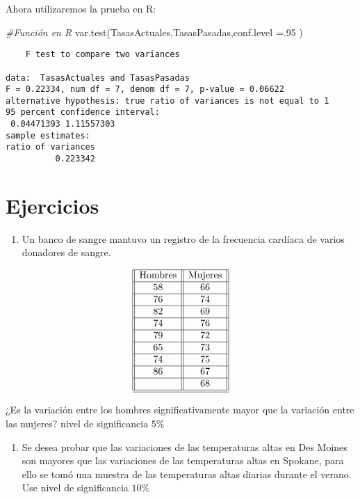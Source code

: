 \documentclass[
  a4paper,
  oneside,
  openany]{book}
\newenvironment{Shaded}{\begin{snugshade}}{\end{snugshade}}
\newcommand{\AttributeTok}[1]{\textcolor[rgb]{0.77,0.63,0.00}{#1}}
\newcommand{\CommentTok}[1]{\textcolor[rgb]{0.56,0.35,0.01}{\textit{#1}}}
\newcommand{\DecValTok}[1]{\textcolor[rgb]{0.00,0.00,0.81}{#1}}
\newcommand{\FunctionTok}[1]{\textcolor[rgb]{0.00,0.00,0.00}{#1}}
\newcommand{\NormalTok}[1]{#1}
\providecommand{\tightlist}{%
  \setlength{\itemsep}{0pt}\setlength{\parskip}{0pt}}
\begin{document}
Ahora utilizaremos la prueba en R:

\begin{Shaded}
\begin{Highlighting}[]
\CommentTok{\#Función en R}
\FunctionTok{var.test}\NormalTok{(TasasActuales,TasasPasadas,}\AttributeTok{conf.level =}\NormalTok{.}\DecValTok{95}\NormalTok{ )}
\end{Highlighting}
\end{Shaded}

\begin{verbatim}
    F test to compare two variances

data:  TasasActuales and TasasPasadas
F = 0.22334, num df = 7, denom df = 7, p-value = 0.06622
alternative hypothesis: true ratio of variances is not equal to 1
95 percent confidence interval:
 0.04471393 1.11557303
sample estimates:
ratio of variances 
          0.223342 
\end{verbatim}

\hypertarget{ejercicios-6}{%
\section{Ejercicios}\label{ejercicios-6}}

\begin{enumerate}
\def\labelenumi{\arabic{enumi}.}
\tightlist
\item
  Un banco de sangre mantuvo un registro de la frecuencia cardíaca de varios donadores de sangre.
\end{enumerate}

\[
\begin{array}{||c| |c||} 
\hline 
\mbox{Hombres}& \mbox{Mujeres} \\  
 \hline
58&66\\
 \hline
76&74\\
 \hline
82&69\\
 \hline
74&76\\
 \hline
79&72\\
 \hline
65&73\\
 \hline
74&75\\
 \hline
86&67\\
 \hline
&68\\
 \hline
\hline
\end{array}
\]

¿Es la variación entre los hombres significativamente mayor que la variación entre las mujeres? nivel de significancia \(5\%\)

\begin{enumerate}
\def\labelenumi{\arabic{enumi}.}
\setcounter{enumi}{1}
\tightlist
\item
  Se desea probar que las variaciones de las temperaturas altas en Des Moines son mayores que las variaciones de las temperaturas altas en Spokane, para ello se tomó una muestra de las temperaturas altas diarias durante el verano. Use nivel de significancia \(10\%\)
\end{enumerate}
\end{document}
